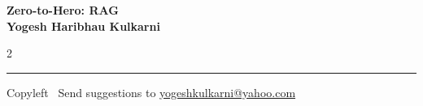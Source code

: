 \documentclass[8pt,landscape]{article}
\begin{document}
\footnotesize


\begin{center}
\Large{\textbf{Zero-to-Hero: RAG\\ Yogesh Haribhau Kulkarni}}
\end{center}

\begin{multicols}{2}

\end{multicols}

\rule{\linewidth}{0.25pt}
\scriptsize
Copyleft \textcopyleft\  Send suggestions to
\href{http://www.yogeshkulkarni.com}{yogeshkulkarni@yahoo.com}
\end{document}
